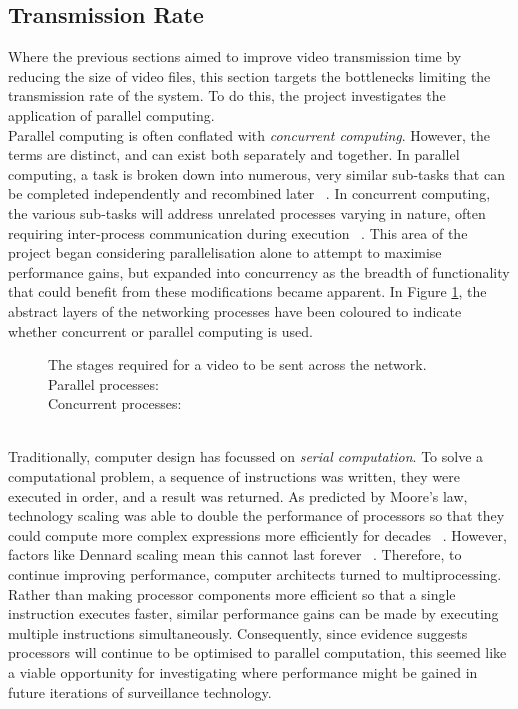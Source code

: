 \subsection{Transmission Rate}
\label{sec:parallelisation}
\setlength{\leftskip}{0.5cm}
\indent \indent
Where the previous sections aimed to improve video transmission time by reducing the size of video files, this section targets the bottlenecks limiting the transmission rate of the system. To do this, the project investigates the application of parallel computing.
\smallskip \\ \indent
Parallel computing is often conflated with \textit{concurrent computing}. However, the terms are distinct, and can exist both separately and together. In parallel computing, a task is broken down into numerous, very similar sub-tasks that can be completed independently and recombined later ~\cite{ParallelismVsConcurrency}. In concurrent computing, the various sub-tasks will address unrelated processes varying in nature, often requiring inter-process communication during execution ~\cite{ParallelismVsConcurrency}. This area of the project began considering parallelisation alone to attempt to maximise performance gains, but expanded into concurrency as the breadth of functionality that could benefit from these modifications became apparent. In Figure \ref{fig:parallelStack}, the abstract layers of the networking processes have been coloured to indicate whether concurrent or parallel computing is used.
\begin{figure}[htp]
    \centering
    \scalebox{0.6}{}
    \captionsetup{justification=centering}
    \caption[Abstract view of parallel processes]{The stages required for a video to be sent across the network.\medskip\\Parallel processes: \hl{\quad\quad\quad\quad}\smallskip\\Concurrent processes: \hl{\quad\quad\quad\quad}}
    \label{fig:parallelStack}
\end{figure}
\smallskip \\ \indent
Traditionally, computer design has focussed on \textit{serial computation}. To solve a computational problem, a sequence of instructions was written, they were executed in order, and a result was returned. As predicted by Moore's law, technology scaling was able to double the performance of processors so that they could compute more complex expressions more efficiently for decades ~\cite{Moore}. However, factors like Dennard scaling mean this cannot last forever ~\cite{Dennard}. Therefore, to continue improving performance, computer architects turned to multiprocessing. Rather than making processor components more efficient so that a single instruction executes faster, similar performance gains can be made by executing multiple instructions simultaneously. Consequently, since evidence suggests processors will continue to be optimised to parallel computation, this seemed like a viable opportunity for investigating where performance might be gained in future iterations of surveillance technology.

